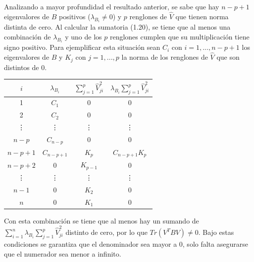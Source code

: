 Analizando a mayor profundidad el resultado anterior, se sabe que hay $n-p+1$ eigenvalores de $B$ positivos ($\lambda_{B_i} \neq 0$) y $p$ renglones de $\widehat{V}$ que tienen norma distinta de cero. Al calcular la sumatoria (1.20), se tiene que al menos una combinación de $\lambda_{B_i}$ y uno de los $p$ renglones cumplen que su multiplicación tiene signo positivo. Para ejemplificar esta situación sean $C_i$ con $i = 1, ... , n-p+1$ los eigenvalores de $B$ y $K_j$ con $j = 1, ... , p$ la norma de los renglones de $\widehat{V}$ que son distintos de $0$.
 
\begin{center}
\begin{tabular}{ | c | c|  c | c|} 
\hline
$i$ & $\lambda_{B_i}$ & $\sum \limits_{j=1}^{p} \widehat{V}_{ji}^2$  & $\lambda_{B_i} \sum \limits_{j=1}^{p} \widehat{V}_{ji}^2$ \\ 
\hline
\hline
1 & $C_1$ & $0$ & $0$ \\ 
\hline
2 & $C_2$ & $0$ & $0$ \\ 
\hline
\vdots & \vdots & \vdots & \vdots \\ 
\hline
$n-p$ & $C_{n-p}$ & $0$ &  $0$\\ 
\hline
$n-p+1$ & $C_{n-p+1}$ & $K_{p}$ &  $C_{n-p+1} K_{p}$\\ 
\hline
$n-p+2$ & $0$ & $K_{p-1}$  & $0$ \\ 
\hline
\vdots & \vdots & \vdots & \vdots  \\ 
\hline
$n-1$ & $0$ & $K_2$ & $0$ \\ 
\hline
$n$ & $0$ & $K_1$ & $0$ \\ 
\hline
\hline

\end{tabular}
\end{center}

Con esta combinación se tiene que al menos hay un sumando de $\sum\limits_{i=1}^{n} \lambda_{B_i} \sum \limits_{j=1}^{p} \widehat{V}_{ji}^2 $ distinto de cero, por lo que $Tr(V^T B V) \neq 0$. Bajo estas condiciones se garantiza que el denominador sea mayor a 0, solo falta asegurarse que el numerador sea menor a infinito.

